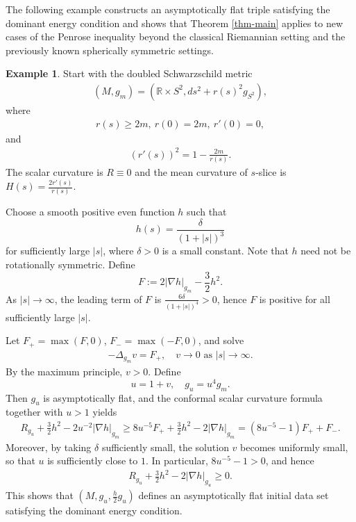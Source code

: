 \documentclass[11pt, letterpaper]{amsart}
\theoremstyle{definition}
\newtheorem{exmp}{Example}[section]
\theoremstyle{remark}
\begin{document}
The following example constructs an asymptotically flat triple satisfying the dominant energy condition and shows that Theorem \ref{thm-main} applies to new cases of the Penrose inequality beyond the classical Riemannian setting and the previously known spherically symmetric settings.

\begin{exmp}\label{exmp-stronger-lower}
Start with the doubled Schwarzschild metric
\begin{align*}
	(M, g_m) = (\mathbb{R}\times S^2,  d s ^2 + r(s) ^2 g_{S^2} ),
\end{align*} 
where
\begin{align*}
	r(s) \geq 2m,\ r(0) = 2m,\ r'(0)=0,
\end{align*} 
and
\begin{align*}
	(r'(s) )^2 = 1- \frac{2m}{r(s)}.
\end{align*} 
The scalar curvature is $R \equiv 0$ and the mean curvature of $s$-slice is $H(s) = \frac{2 r'(s)}{r(s)}$. 

Choose a smooth positive even function $h$ such that 
$$h(s) = \frac{\delta }{(1+ |s|)^3} $$
for sufficiently large $|s|$, where $\delta >0$ is a small constant. Note that $h$ need not be rotationally symmetric. 
Define 
$$F:= 2|\nabla h|_{g_m} - \frac{3}{2} h ^2.$$ 
As $|s| \to \infty$, the leading term of $F$ is $\frac{6 \delta }{(1+ |s|) ^{4}}>0$, hence $F$ is positive for all sufficiently large $|s|$. 

Let $F_{+} = \max(F, 0)$, $F_{-}= \max (-F, 0)$, and solve 
\begin{align*}
	- \Delta _{g_m} v = F_{+} ,\quad v\to 0 \text{ as }|s| \to \infty.
\end{align*} 
 By the maximum principle, $v>0$. Define 
 $$u = 1+ v, \quad g_{u} = u ^{4} g_{m}. $$
 Then $g_{u}$ is asymptotically flat, and the conformal scalar curvature formula together with $u>1$ yields
\begin{align*}
	R_{g_u} + \frac{3}{2} h^2 - 2 u ^{-2}|\nabla h|_{g_m}  \geq   8 u ^{-5} F_{+} + \frac{3}{2} h^2 -2 |\nabla h|_{g_m} = (8 u ^{-5} -1 ) F_{+}+ F_{-}.
\end{align*}
Moreover, by taking $\delta $ sufficiently small, the solution $v$ becomes uniformly small, so that $u$ is sufficiently close to $1$. In particular, $8 u ^{-5} - 1>0$, and hence
\begin{align*}
	R_{g_u} + \frac{3}{2} h^2 - 2|\nabla h|_{g_u} \geq 0.
\end{align*} 
This shows that $(M, g_{u}, \frac{h}{2} g_{u})$ defines an asymptotically flat initial data set satisfying the dominant energy condition. 


\end{exmp}
\end{document}

